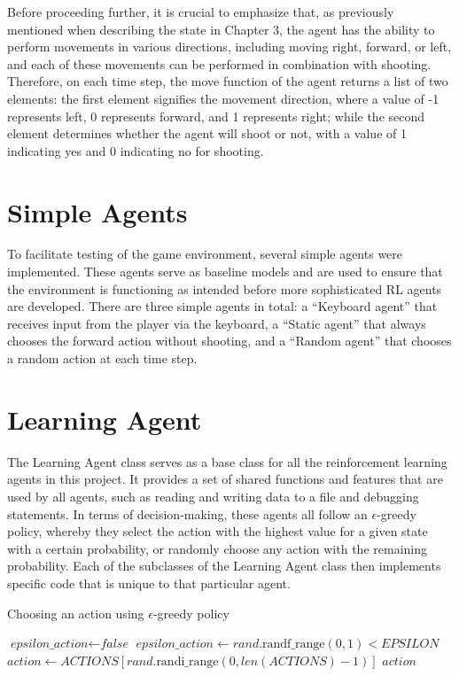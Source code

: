 Before proceeding further, it is crucial to emphasize that, as previously mentioned when describing the state in Chapter 3, the agent has the ability to perform movements in various directions, including moving right, forward, or left, and each of these movements can be performed in combination with shooting. Therefore, on each time step, the move function of the agent returns a list of two elements: the first element signifies the movement direction, where a value of -1 represents left, 0 represents forward, and 1 represents right; while the second element determines whether the agent will shoot or not, with a value of 1 indicating yes and 0 indicating no for shooting.


\section{Simple Agents}
To facilitate testing of the game environment, several simple agents were implemented. These agents serve as baseline models and are used to ensure that the environment is functioning as intended before more sophisticated RL agents are developed. There are three simple agents in total: a ``Keyboard agent'' that receives input from the player via the keyboard, a ``Static agent'' that always chooses the forward action without shooting, and a ``Random agent'' that chooses a random action at each time step. 

\section{Learning Agent}
The Learning Agent class serves as a base class for all the reinforcement learning agents in this project. It provides a set of shared functions and features that are used by all agents, such as reading and writing data to a file and debugging statements. In terms of decision-making, these agents all follow an $\epsilon$-greedy policy, whereby they select the action with the highest value for a given state with a certain probability, or randomly choose any action with the remaining probability. Each of the subclasses of the Learning Agent class then implements specific code that is unique to that particular agent.

\begin{algorithm}
\caption{Choosing an action using $\epsilon$-greedy policy}
\begin{algorithmic}[1]
    \State $\textit{epsilon\_action} \gets \textit{false}$
     
        \State $\textit{epsilon\_action} \gets rand.\text{randf\_range}(0,1) < EPSILON$
            \State $action \gets ACTIONS [rand.\text{randi\_range}(0,len(ACTIONS) - 1)]$  
        \EndIf
    \EndIf
    \State \Return $action$
\EndFunction
\end{algorithmic}
\end{algorithm}

